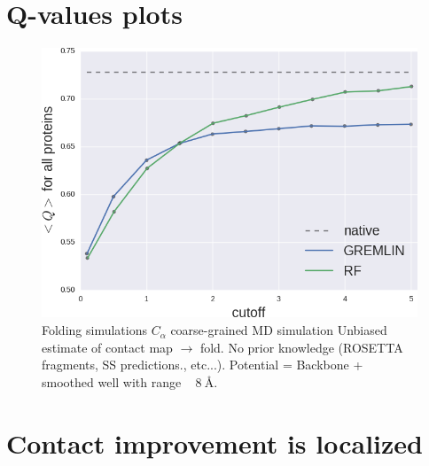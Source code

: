 \documentclass[landscape]{sciposter}
\newlength{\customfigheight}
\begin{document}
\begin{multicols}{3}

\section*{Q-values plots}
\begin{figure}
    \center 
    \includegraphics[height=1.5\customfigheight]{figures/folding/Q_avg.png}

\caption{
Folding simulations
$C_\alpha$ coarse-grained MD simulation
Unbiased estimate of contact map $\rightarrow$ fold.
No prior knowledge (ROSETTA fragments, SS predictions., etc...).
Potential = Backbone + smoothed well with range ~ $\SI{8}{\angstrom}$.
}
\end{figure}

\vfill \columnbreak

\section*{Contact improvement is localized}


\end{multicols}
\end{document}
